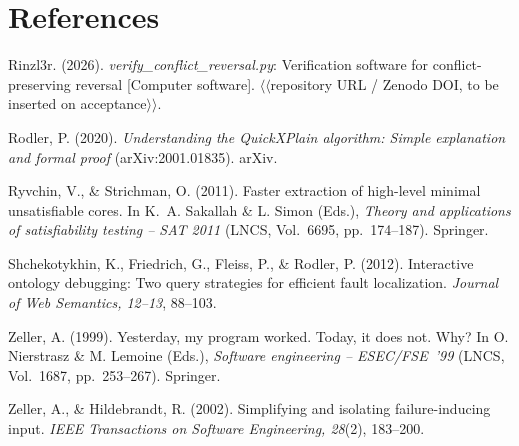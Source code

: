 \documentclass[11pt,reqno]{amsart}
\theoremstyle{plain}
\theoremstyle{definition}
\newcommand{\placeholder}[1]{{\normalfont\sffamily\color{red!60!black}$\langle\!\langle$#1$\rangle\!\rangle$}}
\newenvironment{references}
  {\section*{References}\small\setlength{\parindent}{0pt}%
   \everypar{\hangindent=1.6em\hangafter=1}\setlength{\parskip}{3pt}}
  {\par}
\begin{document}
\begin{references}
Rinzl3r. (2026). \emph{verify\_conflict\_reversal.py}: Verification software for
conflict-preserving reversal [Computer software]. \placeholder{repository URL /
Zenodo DOI, to be inserted on acceptance}.

Rodler, P. (2020). \emph{Understanding the QuickXPlain algorithm: Simple
explanation and formal proof} (arXiv:2001.01835). arXiv.

Ryvchin, V., \& Strichman, O. (2011). Faster extraction of high-level minimal
unsatisfiable cores. In K.~A. Sakallah \& L. Simon (Eds.), \emph{Theory and
applications of satisfiability testing -- SAT 2011} (LNCS, Vol.~6695,
pp.~174--187). Springer.

Shchekotykhin, K., Friedrich, G., Fleiss, P., \& Rodler, P. (2012). Interactive
ontology debugging: Two query strategies for efficient fault localization.
\emph{Journal of Web Semantics, 12--13}, 88--103.

Zeller, A. (1999). Yesterday, my program worked. Today, it does not. Why? In O.
Nierstrasz \& M. Lemoine (Eds.), \emph{Software engineering -- ESEC/FSE~'99} (LNCS,
Vol.~1687, pp.~253--267). Springer.

Zeller, A., \& Hildebrandt, R. (2002). Simplifying and isolating failure-inducing
input. \emph{IEEE Transactions on Software Engineering, 28}(2), 183--200.
\end{references}
\end{document}
